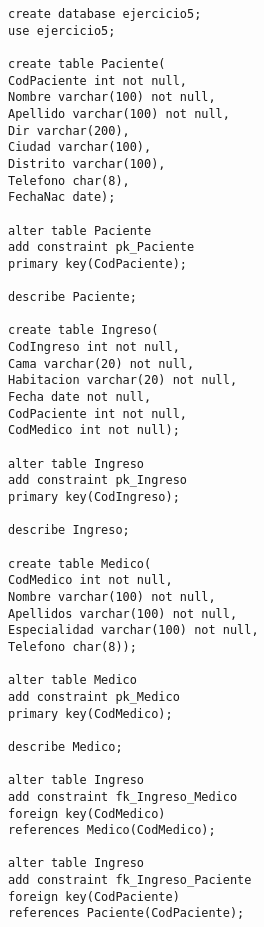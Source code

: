 \documentclass[a4paper,12pt]{article}
\begin{document}
\begin{lstlisting}
create database ejercicio5;
use ejercicio5;

create table Paciente(
CodPaciente int not null,
Nombre varchar(100) not null,
Apellido varchar(100) not null,
Dir varchar(200),
Ciudad varchar(100),
Distrito varchar(100),
Telefono char(8),
FechaNac date);

alter table Paciente
add constraint pk_Paciente
primary key(CodPaciente);

describe Paciente;

create table Ingreso(
CodIngreso int not null,
Cama varchar(20) not null,
Habitacion varchar(20) not null,
Fecha date not null,
CodPaciente int not null,
CodMedico int not null);

alter table Ingreso
add constraint pk_Ingreso
primary key(CodIngreso);

describe Ingreso;

create table Medico(
CodMedico int not null,
Nombre varchar(100) not null,
Apellidos varchar(100) not null,
Especialidad varchar(100) not null,
Telefono char(8));

alter table Medico
add constraint pk_Medico
primary key(CodMedico);

describe Medico;

alter table Ingreso
add constraint fk_Ingreso_Medico
foreign key(CodMedico)
references Medico(CodMedico);

alter table Ingreso
add constraint fk_Ingreso_Paciente
foreign key(CodPaciente)
references Paciente(CodPaciente);
\end{lstlisting}
\end{document}
